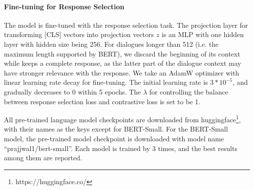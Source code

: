 \documentclass[letterpaper]{article} \usepackage{aaai22}  \usepackage{times}  \usepackage{helvet}  \usepackage{courier}  \usepackage[hyphens]{url}  \usepackage{graphicx} \urlstyle{rm} \def\UrlFont{\rm}  \usepackage{natbib}  \usepackage{caption} \DeclareCaptionStyle{ruled}{labelfont=normalfont,labelsep=colon,strut=off} \frenchspacing  \setlength{\pdfpagewidth}{8.5in}  \setlength{\pdfpageheight}{11in}  \usepackage{algorithm}
\begin{document}
\paragraph{Fine-tuning for Response Selection} The model is fine-tuned with the response selection task. The projection layer for transforming [CLS] vectors into projection vectors $z$ is an MLP with one hidden layer with hidden size being 256. For dialogues longer than 512 (i.e. the maximum length supported by BERT), we discard the beginning of its context while keeps a complete response, as the latter part of the dialogue context may have stronger relevance with the response. We take an AdamW optimizer\cite{loshchilov2017decoupled} with linear learning rate decay for fine-tuning. The initial learning rate is $3*10^{-5}$, and gradually decreases to 0 within 5 epochs. The $\lambda$ for controlling the balance between response selection loss and contrastive loss is set to be 1.

All pre-trained language model checkpoints are downloaded from huggingface\footnote{https://huggingface.co/}, with their names as the keys except for BERT-Small. For the BERT-Small model, the pre-trained model checkpoint is downloaded  with model name ``prajjwal1/bert-small''.
Each model is trained by 3 times, and the best results among them are reported.

 
\end{document}

